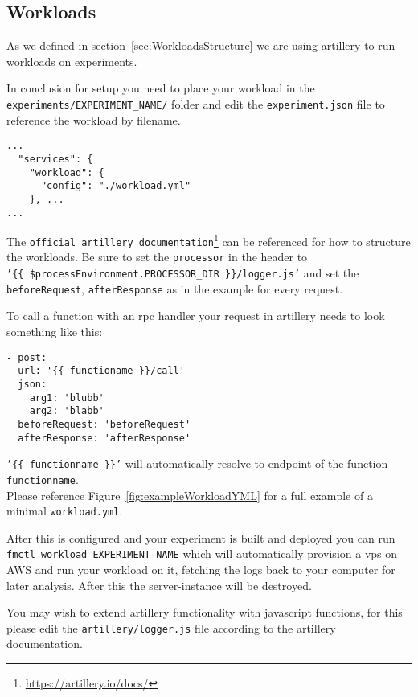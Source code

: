 \documentclass[../main.tex]{subfiles}
\begin{document}
\subsection{Workloads}\label{sec:WorkloadsUsage}

As we defined in section~\ref{sec:WorkloadsStructure} we are using artillery to run workloads on experiments. 

In conclusion for setup you need to place your workload in the \\
\texttt{experiments/EXPERIMENT\_NAME/} 
folder and edit the \texttt{experiment.json} file to reference the workload by filename.

\begin{tcolorbox}[titleDetachedStyle, title=\texttt{experiment.json}]
\begin{verbatim}
...
  "services": {
    "workload": {
      "config": "./workload.yml"
    }, ...
...
\end{verbatim}
\end{tcolorbox}

The \texttt{official artillery documentation}\footnote{\url{https://artillery.io/docs/}} can be referenced for how to structure the workloads. Be sure to set the \texttt{processor} in the header to \\\texttt{'\{\{ \$processEnvironment.PROCESSOR\_DIR \}\}/logger.js'} and set the \texttt{beforeRequest}, \texttt{afterResponse} as in the example  for every request. 



To call a function with an rpc handler your request in artillery needs to look something like this:

\begin{tcolorbox}[titleDetachedStyle, title=\texttt{workload.yml}]
\begin{verbatim}
- post:
  url: '{{ functioname }}/call'
  json:
    arg1: 'blubb' 
    arg2: 'blabb'
  beforeRequest: 'beforeRequest'
  afterResponse: 'afterResponse'
\end{verbatim}
\end{tcolorbox}

\texttt{'\{\{ functionname \}\}'} will automatically resolve to endpoint of the function \texttt{functionname}. \\
Please reference Figure~\ref{fig:exampleWorkloadYML} for a full example of a minimal \texttt{workload.yml}.

After this is configured and your experiment is built and deployed you can run \texttt{fmctl workload EXPERIMENT\_NAME} which will automatically provision a vps on AWS and run your workload on it, fetching the logs back to your computer for later analysis. After this the server-instance will be destroyed.

You may wish to extend artillery functionality with javascript functions, for this please edit the \texttt{artillery/logger.js} file according to the artillery documentation.
\end{document}
